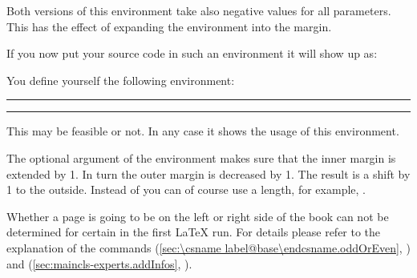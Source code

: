 Both versions of this environment take also negative values for all
parameters. This has the effect of expanding the environment into the
margin.
\ifCommonscrlttr\else
\begin{Example}
  \label{desc:maincls.env.addmargin.example}%
\begin{lstcode}
  \newenvironment{SourceCodeFrame}{%
    \begin{addmargin*}[1em]{-1em}%
      \begin{minipage}{\linewidth}%
        \rule{\linewidth}{2pt}%
  }{%
      \rule[.25\baselineskip]{\linewidth}{2pt}%
      \end{minipage}%
    \end{addmargin*}%
  }
\end{lstcode}
  If you now put your source code in such an environment it will show
  up as:
  \begin{ShowOutput}
  \newenvironment{SourceCodeFrame}{%
    \begin{addmargin*}[1em]{-1em}%
      \begin{minipage}{\linewidth}%
        \rule{\linewidth}{2pt}%
  }{%
      \rule[.25\baselineskip]{\linewidth}{2pt}%
      \end{minipage}%
    \end{addmargin*}%
  }
  You define yourself the following environment:
  \begin{SourceCodeFrame}
\begin{lstcode}
\newenvironment{\SourceCodeFrame}{%
  \begin{addmargin*}[1em]{-1em}%
    \begin{minipage}{\linewidth}%
      \rule{\linewidth}{2pt}%
}{%
    \rule[.25\baselineskip]{\linewidth}{2pt}%
    \end{minipage}%
  \end{addmargin*}%
}
\end{lstcode}
  \end{SourceCodeFrame}
  This may be feasible or not. In any case it shows the usage of this
  environment.
  \end{ShowOutput}
  The optional argument of the  environment
  makes sure that the inner margin is extended by 1. In turn
  the outer margin is decreased by 1. The result is a shift
  by 1 to the outside.  Instead of \PValue{1em} you can of
  course use a length, for example, .
\end{Example}

Whether a page is going to be on the left or right side
of the book can not be determined for certain in the first {\LaTeX}
run.  For details please refer to the explanation of the commands
 (\autoref{sec:\csname
  label@base\endcsname.oddOrEven}, ) and 
(\autoref{sec:maincls-experts.addInfos},
).

